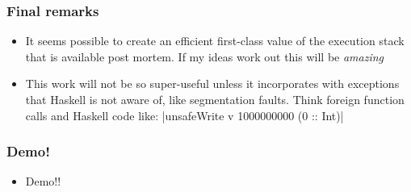 \documentclass[11pt]{beamer} %
\begin{document}
  \begin{frame}
   \frametitle{Final remarks}
  \begin{itemize}
   \item <1-> It seems possible to create an efficient first-class value of the
     execution stack that is available post mortem. If my ideas work out this
     will be \emph{amazing}
   \item <1-> This work will not be so super-useful unless it incorporates with
     exceptions that Haskell is not aware of, like segmentation faults. Think
     foreign function calls and Haskell code like: |unsafeWrite v 1000000000 (0 :: Int)|
  \end{itemize}
  \end{frame}

  \begin{frame}
   \frametitle{Demo!}
  \begin{itemize}
   \item Demo!!
  \end{itemize}
  \end{frame}
\end{document}
